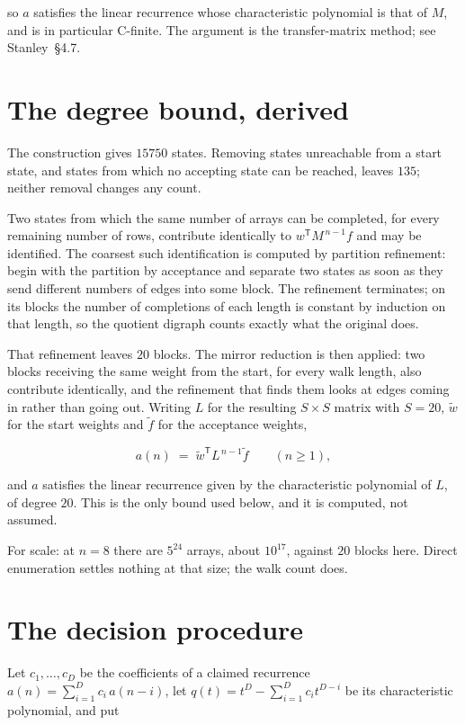 \documentclass[11pt]{article}
\theoremstyle{definition}
\begin{document}
so $a$ satisfies the linear recurrence whose characteristic polynomial is that of $M$, and is in particular C-finite. The argument is the transfer-matrix method; see Stanley~\S4.7.

\section{The degree bound, derived}

The construction gives $15750$ states. Removing states unreachable from a start state, and states from which no accepting state can be reached, leaves $135$; neither removal changes any count.

Two states from which the same number of arrays can be completed, for every remaining number of rows, contribute identically to $w^{\mathsf T}M^{\,n-1}f$ and may be identified. The coarsest such identification is computed by partition refinement: begin with the partition by acceptance and separate two states as soon as they send different numbers of edges into some block. The refinement terminates; on its blocks the number of completions of each length is constant by induction on that length, so the quotient digraph counts exactly what the original does.

That refinement leaves $20$ blocks. The mirror reduction is then applied: two blocks receiving the same weight from the start, for every walk length, also contribute identically, and the refinement that finds them looks at edges coming in rather than going out. Writing $L$ for the resulting $S \times S$ matrix with $S = 20$, $\tilde w$ for the start weights and $\tilde f$ for the acceptance weights,

\[a(n) \;=\; \tilde w^{\mathsf T} L^{\,n-1} \tilde f \qquad (n \ge 1),\]

and $a$ satisfies the linear recurrence given by the characteristic polynomial of $L$, of degree $20$. This is the only bound used below, and it is computed, not assumed.

For scale: at $n = 8$ there are $5^{24}$ arrays, about $10^{17}$, against $20$ blocks here. Direct enumeration settles nothing at that size; the walk count does.

\section{The decision procedure}

Let $c_1,\dots,c_D$ be the coefficients of a claimed recurrence $a(n) = \sum_{i=1}^{D} c_i\,a(n-i)$, let $q(t) = t^{D} - \sum_{i=1}^{D} c_i t^{D-i}$ be its characteristic polynomial, and put
\end{document}
